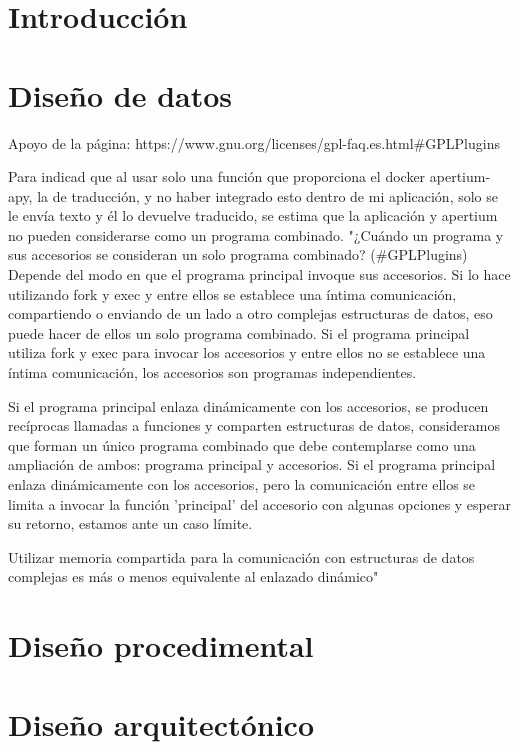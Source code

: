 
\section{Introducción}

\section{Diseño de datos}
Apoyo de la página:  https://www.gnu.org/licenses/gpl-faq.es.html#GPLPlugins

Para indicad que al usar solo una función que proporciona el docker apertium-apy, la de traducción, y no haber integrado esto dentro de mi aplicación, solo se le envía texto y él lo devuelve traducido, se estima que la aplicación y apertium no pueden considerarse como un programa combinado.
"¿Cuándo un programa y sus accesorios se consideran un solo programa combinado? (#GPLPlugins)
Depende del modo en que el programa principal invoque sus accesorios. Si lo hace utilizando fork y exec y entre ellos se establece una íntima comunicación, compartiendo o enviando de un lado a otro complejas estructuras de datos, eso puede hacer de ellos un solo programa combinado. Si el programa principal utiliza fork y exec para invocar los accesorios y entre ellos no se establece una íntima comunicación, los accesorios son programas independientes.

Si el programa principal enlaza dinámicamente con los accesorios, se producen recíprocas llamadas a funciones y comparten estructuras de datos, consideramos que forman un único programa combinado que debe contemplarse como una ampliación de ambos: programa principal y accesorios. Si el programa principal enlaza dinámicamente con los accesorios, pero la comunicación entre ellos se limita a invocar la función 'principal' del accesorio con algunas opciones y esperar su retorno, estamos ante un caso límite.

Utilizar memoria compartida para la comunicación con estructuras de datos complejas es más o menos equivalente al enlazado dinámico"

\section{Diseño procedimental}

\section{Diseño arquitectónico}



